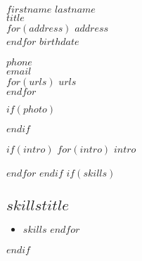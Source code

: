 \documentclass[$fontsize$, a4paper, oneside]{article}
\begin{document}
\begin{minipage}[t]{0.4\linewidth}

{\LARGE $firstname$ $lastname$}\\
\vspace{\baselineskip}
{\Large \MakeLowercase{\textsc{$title$}}}\\
\vspace{\baselineskip}
$for(address)$
$address$\\
$endfor$
\vspace{\baselineskip}
$birthdate$\\

\end{minipage}
\begin{minipage}[t]{0.4\linewidth}
\vspace{.63cm}

\href{tel:$phone$}{$phone$}\\
\href{mailto:$email$}{$email$}\\
\vspace{\baselineskip}
$for(urls)$
\href{http://$urls$}{$urls$}\\
$endfor$

\end{minipage}
$if(photo)$
\begin{minipage}[t]{0.2\linewidth}
\vspace{-1.4cm}
\begin{flushright}
\end{flushright}

\end{minipage}
$endif$

$if(intro)$
\vspace{.915cm}
$for(intro)$
$intro$

\setlength\parindent{1em}
$endfor$
\setlength\parindent{0em}
$endif$
\vspace{4pt}
$if(skills)$
\subsection*{$skillstitle$}
\begin{itemize}
    $for(skills)$
      \item $skills$
    $endfor$
\end{itemize}
$endif$
\end{document}
